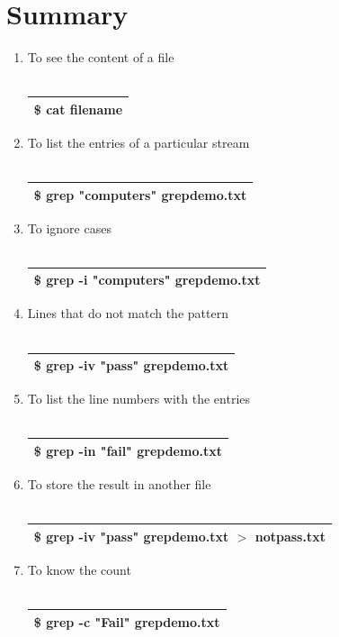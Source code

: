 \documentclass[12pt, a4paper]{report}
\begin{document}
\section{Summary}
\begin{enumerate}
\item To see the content of a file\\
\\
\begin{tabular}{|l|}\hline
\$ cat filename\\ \hline
\end{tabular}
\item To list the entries of a particular stream\\
\\
\begin{tabular}{|l|}\hline
\$ grep "computers" grepdemo.txt\\ \hline
\end{tabular}
\item To ignore cases\\
\\
\begin{tabular}{|l|}\hline
\$ grep -i "computers" grepdemo.txt\\ \hline
\end{tabular}
\item Lines that do not match the pattern\\
\\
\begin{tabular}{|l|}\hline
\$ grep -iv "pass" grepdemo.txt\\ \hline
\end{tabular}
\item To list the line numbers with the entries\\
\\
\begin{tabular}{|l|}\hline
\$ grep -in "fail" grepdemo.txt\\ \hline
\end{tabular}
\item To store the result in another file\\
\\
\begin{tabular}{|l|}\hline
\$ grep -iv "pass" grepdemo.txt $>$ notpass.txt\\ \hline
\end{tabular}
\item To know the count\\
\\
\begin{tabular}{|l|}\hline
\$ grep -c "Fail" grepdemo.txt\\ \hline
\end{tabular}
\end{enumerate}
\end{document}
